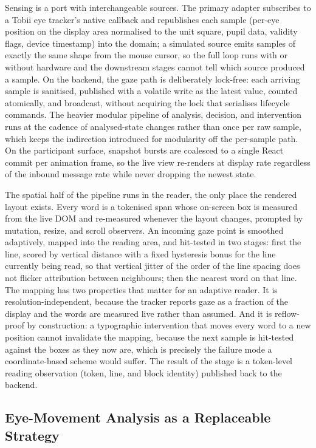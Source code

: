 Sensing is a port with interchangeable sources.
The primary adapter subscribes to a Tobii eye tracker's native callback and republishes each sample (per-eye position on the display area normalised to the unit square, pupil data, validity flags, device timestamp) into the domain; a simulated source emits samples of exactly the same shape from the mouse cursor, so the full loop runs with or without hardware and the downstream stages cannot tell which source produced a sample.
On the backend, the gaze path is deliberately lock-free: each arriving sample is sanitised, published with a volatile write as the latest value, counted atomically, and broadcast, without acquiring the lock that serialises lifecycle commands.
The heavier modular pipeline of analysis, decision, and intervention runs at the cadence of analysed-state changes rather than once per raw sample, which keeps the indirection introduced for modularity off the per-sample path.
On the participant surface, snapshot bursts are coalesced to a single React commit per animation frame, so the live view re-renders at display rate regardless of the inbound message rate while never dropping the newest state.

The spatial half of the pipeline runs in the reader, the only place the rendered layout exists.
Every word is a tokenised span whose on-screen box is measured from the live DOM and re-measured whenever the layout changes, prompted by mutation, resize, and scroll observers.
An incoming gaze point is smoothed adaptively, mapped into the reading area, and hit-tested in two stages: first the line, scored by vertical distance with a fixed hysteresis bonus for the line currently being read, so that vertical jitter of the order of the line spacing does not flicker attribution between neighbours; then the nearest word on that line.
The mapping has two properties that matter for an adaptive reader.
It is resolution-independent, because the tracker reports gaze as a fraction of the display and the words are measured live rather than assumed.
And it is reflow-proof by construction: a typographic intervention that moves every word to a new position cannot invalidate the mapping, because the next sample is hit-tested against the boxes as they now are, which is precisely the failure mode a coordinate-based scheme would suffer.
The result of the stage is a token-level reading observation (token, line, and block identity) published back to the backend.

\subsection{Eye-Movement Analysis as a Replaceable Strategy}
\label{sec:platform-analysis}

